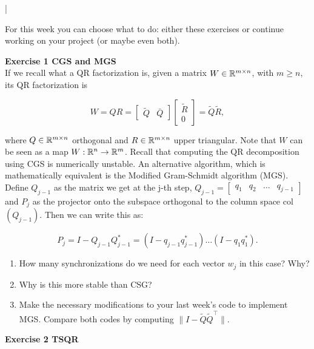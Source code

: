 \documentclass[11pt]{article}
\begin{document}
\lstset{frameround=fttt,language=Matlab}

\lstMakeShortInline[columns=fixed]|


For this week you can choose what to do: either these exercises or continue working on your project (or maybe even both). 

{\bf{Exercise 1 CGS and MGS}}\\

If we recall what a QR factorization is, given a matrix $W \in \mathbb{R}^{m \times n}$, with $m \geq n$, its QR factorization is

\[ W = QR = \begin{bmatrix} \tilde{Q} & \bar{Q} \end{bmatrix} \begin{bmatrix} \tilde{R} \\ 0 \end{bmatrix} = \tilde{Q}\tilde{R}, \]

where $Q \in \mathbb{R}^{m \times n}$ orthogonal and $R \in \mathbb{R}^{m \times n}$ upper triangular. Note that $W$ can be seen as a map $W: \mathbb{R}^{n} \to \mathbb{R}^{m}$. Recall that computing the QR decomposition using CGS is numerically unstable. An alternative algorithm, which is mathematically equivalent is the Modified Gram-Schmidt algorithm (MGS). Define $Q_{j-1}$ as the matrix we get at the j-th step, $Q_{j-1} = \begin{bmatrix} q_1 & q_2 & \hdots & q_{j-1} \end{bmatrix}$ and $P_j$ as the projector onto the subspace orthogonal to the column space col$(Q_{j-1})$. Then we can write this as:

\[ P_j = I - Q_{j-1}Q_{j-1}^* = (I - q_{j-1}q_{j-1}^*) \hdots  (I - q_{1}q_{1}^*).\]

\begin{enumerate}
   \item How many synchronizations do we need for each vector $w_j$ in this case? Why?
   \item Why is this more stable than CSG?
   \item Make the necessary modifications to your last week's code to implement MGS. Compare both codes by computing $\|I - \tilde{Q}\tilde{Q}^\top\|$. 
\end{enumerate}

\bigskip

{\bf{Exercise 2 TSQR}}\\
\end{document}
